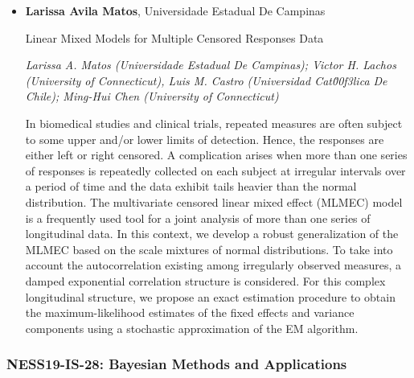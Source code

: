 \begin{itemize}
\item \textbf{Larissa Avila Matos}, Universidade Estadual De Campinas

Linear Mixed Models for Multiple Censored Responses Data

\emph{\footnotesize Larissa A. Matos (Universidade Estadual De Campinas); Victor H. Lachos (University of Connecticut),  Luis M. Castro (Universidad Cat\u00f3lica De Chile); Ming-Hui Chen (University of Connecticut)}

In biomedical studies and clinical trials, repeated measures are often subject to some upper and/or lower limits of detection. Hence, the responses are either left or right censored. A complication arises when more than one series of responses is repeatedly collected on each subject at irregular intervals over a period of time and the data exhibit tails heavier than the normal distribution. The multivariate censored linear mixed effect (MLMEC) model is a frequently used tool for a joint analysis of more than one series of longitudinal data. In this context, we develop a robust generalization of the MLMEC based on the scale mixtures of normal distributions. To take into account the autocorrelation existing among irregularly observed measures, a damped exponential correlation structure is considered. For this complex longitudinal structure, we propose an exact estimation procedure to obtain the maximum-likelihood estimates of the fixed effects and variance components using a stochastic approximation of the EM algorithm. 


\end{itemize}

\subsubsection*{NESS19-IS-28: Bayesian Methods and Applications}

